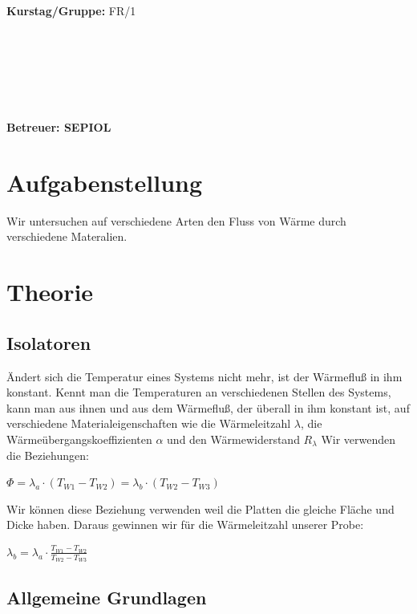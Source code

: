 \documentclass[12pt,a4paper,twopage]{article}
\begin{document}
\begin{verbatim}


\end{verbatim}
			\begin{flushleft}
			\textbf{\Large{Kurstag/Gruppe:}} \Large{FR/1}
			\end{flushleft}

\begin{verbatim}






\end{verbatim}
			\begin{flushleft}
			\LARGE{\textbf{Betreuer:\Large{ SEPIOL }}}		
			\end{flushleft}
			
\section{Aufgabenstellung}
Wir untersuchen auf verschiedene Arten den Fluss von Wärme durch verschiedene Materalien.
\section{Theorie}
\subsection{Isolatoren}
Ändert sich die Temperatur eines Systems nicht mehr, ist der Wärmefluß in ihm konstant. Kennt man die Temperaturen an verschiedenen Stellen des Systems, kann man aus ihnen und aus dem Wärmefluß, der überall in ihm konstant ist, auf verschiedene Materialeigenschaften wie die Wärmeleitzahl $\lambda$, die Wärmeübergangskoeffizienten $\alpha$ und den Wärmewiderstand $R_\lambda$
Wir verwenden die Beziehungen:

\( \Phi = \lambda_a \cdot (T_{W1}-T_{W2})= \lambda_b \cdot (T_{W2}-T_{W3}) \)

Wir können diese Beziehung verwenden weil die Platten die gleiche Fläche und Dicke haben. Daraus gewinnen wir für die Wärmeleitzahl unserer Probe:

\( \lambda_b = \lambda_a \cdot \frac{T_{W1}-T_{W2}}{T_{W2}-T_{W3}} \)


\subsection{Allgemeine Grundlagen}
\end{document}
